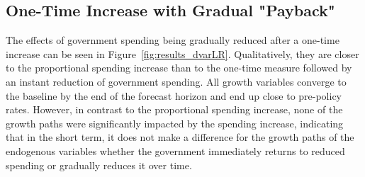 



\subsection{One-Time Increase with Gradual "Payback"}

The effects of government spending being gradually reduced after a one-time increase can be seen in Figure~\ref{fig:results_dvarLR}. Qualitatively, they are closer to the proportional spending increase than to the one-time measure followed by an instant reduction of government spending. All growth variables converge to the baseline by the end of the forecast horizon and end up close to pre-policy rates. However, in contrast to the proportional spending increase, none of the growth paths were significantly impacted by the spending increase, indicating that in the short term, it does not make a difference for the growth paths of the endogenous variables whether the government immediately returns to reduced spending or gradually reduces it over time.

